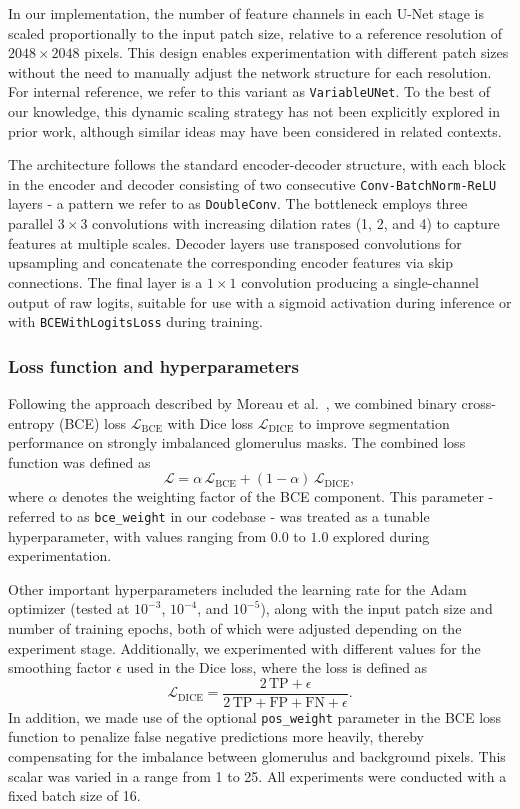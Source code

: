 \documentclass[12pt]{article}
\begin{document}
In our implementation, the number of feature channels in each U-Net stage is scaled proportionally to the input patch size, relative to a reference resolution of $2048 \times 2048$ pixels. This design enables experimentation with different patch sizes without the need to manually adjust the network structure for each resolution. For internal reference, we refer to this variant as \texttt{VariableUNet}. To the best of our knowledge, this dynamic scaling strategy has not been explicitly explored in prior work, although similar ideas may have been considered in related contexts.

The architecture follows the standard encoder-decoder structure, with each block in the encoder and decoder consisting of two consecutive \texttt{Conv-BatchNorm-ReLU} layers - a pattern we refer to as \texttt{DoubleConv}. The bottleneck employs three parallel $3 \times 3$ convolutions with increasing dilation rates (1, 2, and 4) to capture features at multiple scales. Decoder layers use transposed convolutions for upsampling and concatenate the corresponding encoder features via skip connections. The final layer is a $1 \times 1$ convolution producing a single-channel output of raw logits, suitable for use with a sigmoid activation during inference or with \texttt{BCEWithLogitsLoss} during training.

\subsubsection{Loss function and hyperparameters}

Following the approach described by Moreau et al.~\cite{Moreau.2024}, we combined binary cross-entropy (BCE) loss $\mathcal{L}_{\mathrm{BCE}}$ with Dice loss $\mathcal{L}_{\mathrm{DICE}}$ to improve segmentation performance on strongly imbalanced glomerulus masks. The combined loss function was defined as 
\[
\mathcal{L} = \alpha\,\mathcal{L}_{\mathrm{BCE}} + (1 - \alpha)\,\mathcal{L}_{\mathrm{DICE}},
\]
where $\alpha$ denotes the weighting factor of the BCE component. This parameter - referred to as \texttt{bce\_weight} in our codebase - was treated as a tunable hyperparameter, with values ranging from $0.0$ to $1.0$ explored during experimentation.

Other important hyperparameters included the learning rate for the Adam optimizer (tested at $10^{-3}$, $10^{-4}$, and $10^{-5}$), along with the input patch size and number of training epochs, both of which were adjusted depending on the experiment stage. Additionally, we experimented with different values for the smoothing factor $\epsilon$ used in the Dice loss, where the loss is defined as
\[
\mathcal{L}_{\mathrm{DICE}} = \frac{2\,\mathrm{TP} + \epsilon}{2\,\mathrm{TP} + \mathrm{FP} + \mathrm{FN} + \epsilon}.
\]
In addition, we made use of the optional \texttt{pos\_weight} parameter in the BCE loss function to penalize false negative predictions more heavily, thereby compensating for the imbalance between glomerulus and background pixels. This scalar was varied in a range from 1 to 25. All experiments were conducted with a fixed batch size of 16.
\end{document}
